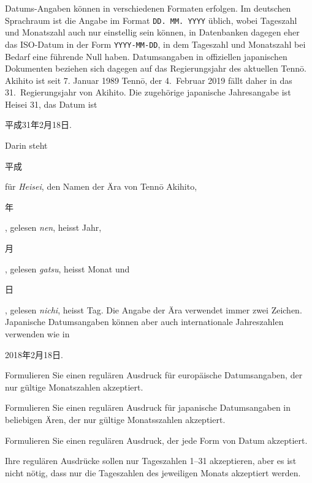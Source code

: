 Datums-Angaben können in verschiedenen Formaten erfolgen.
Im deutschen Sprachraum ist die Angabe im Format \texttt{DD. MM. YYYY}
üblich, wobei Tageszahl und Monatszahl auch nur einstellig sein können,
in Datenbanken dagegen eher das ISO-Datum in der Form \texttt{YYYY-MM-DD},
in dem Tageszahl und Monatszahl bei Bedarf eine führende Null haben.
Datumsangaben in offiziellen japanischen Dokumenten beziehen sich dagegen
auf das Regierungsjahr des aktuellen Tenn\=o.
Akihito ist seit 7. Januar 1989 Tenn\=o, der 4.~Februar 2019 fällt daher in
das 31.~Regierungsjahr von Akihito.
Die zugehörige japanische Jahresangabe ist Heisei 31, das Datum ist
\begin{CJK}{UTF8}{min}平成31年2月18日.\end{CJK}
Darin steht 
\begin{CJK}{UTF8}{min}平成\end{CJK} für {\em Heisei}, den Namen der Ära von
Tenn\=o Akihito,
\begin{CJK}{UTF8}{min}年\end{CJK}, gelesen {\em nen}, heisst Jahr,
\begin{CJK}{UTF8}{min}月\end{CJK}, gelesen {\em gatsu}, heisst Monat
und
\begin{CJK}{UTF8}{min}日\end{CJK}, gelesen {\em nichi}, heisst Tag.
Die Angabe der Ära verwendet immer zwei Zeichen.
Japanische Datumsangaben können aber auch internationale Jahreszahlen
verwenden wie in 
\begin{CJK}{UTF8}{min}2018年2月18日.\end{CJK}

\begin{teilaufgaben}
\item Formulieren Sie einen regulären Ausdruck für europäische Datumsangaben,
der nur gültige Monatszahlen akzeptiert.
\item Formulieren Sie einen regulären Ausdruck für japanische Datumsangaben in
beliebigen Ären, der nur gültige Monatsszahlen akzeptiert.
\item Formulieren Sie einen regulären Ausdruck, der jede Form von Datum
akzeptiert.
\end{teilaufgaben}

\begin{hinweis}
Ihre regulären Ausdrücke sollen nur Tageszahlen 1--31 akzeptieren, aber
es ist nicht nötig, dass nur die Tageszahlen des jeweiligen Monats akzeptiert
werden.
\end{hinweis}

